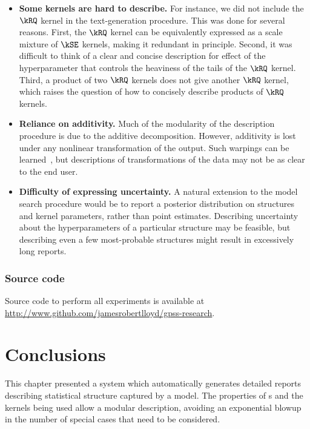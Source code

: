 \begin{itemize}

\item {\bf Some kernels are hard to describe.}
For instance, we did not include the $\kRQ$ kernel in the text-generation procedure.
This was done for several reasons.
First, the $\kRQ$ kernel can be equivalently expressed as a scale mixture of $\kSE$ kernels, making it redundant in principle.
Second, it was difficult to think of a clear and concise description for effect of the hyperparameter that controls the heaviness of the tails of the $\kRQ$ kernel.
Third, a product of two $\kRQ$ kernels does not give another $\kRQ$ kernel, which raises the question of how to concisely describe products of $\kRQ$ kernels.

\item {\bf Reliance on additivity.}
Much of the modularity of the description procedure is due to the additive decomposition.
However, additivity is lost under any nonlinear transformation of the output.
Such warpings can be learned~\citep{snelson2004warped}, but descriptions of transformations of the data may not be as clear to the end user.

\item {\bf Difficulty of expressing uncertainty.}
A natural extension to the model search procedure would be to report a posterior distribution on structures and kernel parameters, rather than point estimates.
Describing uncertainty about the hyperparameters of a particular structure may be feasible,
but describing even a few most-probable structures might result in excessively long reports.

\end{itemize}


\subsubsection{Source code}
Source code to perform all experiments is available at \\\url{http://www.github.com/jamesrobertlloyd/gpss-research}. 




\section{Conclusions}
This chapter presented a system which automatically generates detailed reports describing statistical structure captured by a \gp{} model.
The properties of \gp{}s and the kernels being used allow a modular description, avoiding an exponential blowup in the number of special cases that need to be considered.

